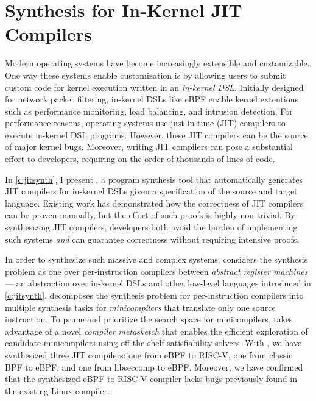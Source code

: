 \section{Synthesis for In-Kernel JIT Compilers}
Modern operating systems have become increasingly extensible and customizable.
One way these systems enable customization is by
allowing users to submit custom code for kernel execution
written in an \textit{in-kernel DSL}.
Initially designed for network packet filtering, 
in-kernel DSLs like eBPF  enable kernel extentions
such as performance monitoring, load balancing, and intrusion detection.
For performance reasons, operating systems use just-in-time (JIT) compilers
to execute in-kernel DSL programs.
However,
these JIT compilers can be the source of major kernel bugs.
Moreover, writing JIT compilers can pose a substantial effort to developers,
requiring on the order of thousands of lines of code.

In \cref{c:jitsynth}, I present \jitsynth, a program synthesis tool that
automatically generates JIT compilers for in-kernel DSLs
given a specification of the source and target language.
Existing work has demonstrated how the correctness of JIT compilers
can be proven manually,
but the effort of such proofs is highly non-trivial.
By synthesizing JIT compilers, developers both avoid the burden of implementing
such systems \textit{and} can guarantee correctness
without requiring intensive proofs.

In order to synthesize such massive and complex systems,
\jitsynth considers the synthesis problem as one over per-instruction compilers
between \textit{abstract register machines} --- an abstraction over
in-kernel DSLs and other low-level languages introduced in \cref{c:jitsynth}.
\jitsynth decomposes the synthesis problem for per-instruction compilers
into multiple synthesis tasks for \textit{minicompilers}
that translate only one source instruction. %
To prune and prioritize the search space for minicompilers,
\jitsynth takes advantage of a novel \textit{compiler metasketch}
that enables the efficient exploration of candidate minicompilers
using off-the-shelf satisfiability solvers.
With \jitsynth, we have synthesized three JIT compilers:
one from eBPF to RISC-V,
one from classic BPF to eBPF,
and one from libseccomp to eBPF.
Moreover, we have confirmed that the synthesized eBPF to RISC-V compiler
lacks bugs previously found in the existing Linux compiler.

